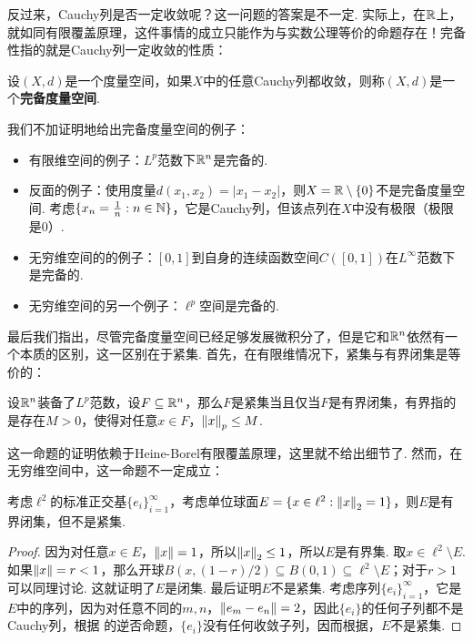 反过来，Cauchy列是否一定收敛呢？这一问题的答案是不一定. 实际上，在$\mathbb{R}$上，就如同有限覆盖原理，这件事情的成立只能作为与实数公理等价的命题存在！完备性指的就是Cauchy列一定收敛的性质：

\begin{definition}[完备度量空间]
    设$(X,d)$是一个度量空间，如果$X$中的任意Cauchy列都收敛，则称$(X,d)$是一个\textbf{完备度量空间}. 
\end{definition}
我们不加证明地给出完备度量空间的例子：
\begin{example}
\begin{itemize}
\item 有限维空间的例子：$L^p$范数下$\mathbb{R}^n$是完备的.
\item 反面的例子：使用度量$d(x_1,x_2)=|x_1-x_2|$，则$X=\mathbb{R}\setminus\{0\}$不是完备度量空间. 考虑$\{x_n=\frac1n:n\in\mathbb{N}\}$，它是Cauchy列，但该点列在$X$中没有极限（极限是$0$）.
\item 无穷维空间的的例子：$[0,1]$到自身的连续函数空间$C([0,1])$在$L^\infty$范数下是完备的.
\item 无穷维空间的另一个例子：$\ell^p$空间是完备的. 
\end{itemize}
\end{example}

最后我们指出，尽管完备度量空间已经足够发展微积分了，但是它和$\mathbb{R}^n$依然有一个本质的区别，这一区别在于紧集. 首先，在有限维情况下，紧集与有界闭集是等价的：

\begin{proposition}\label{prop:compact-bounded}
设$\mathbb{R}^n$装备了$L^p$范数，设$F\subseteq\mathbb{R}^n$，那么$F$是紧集当且仅当$F$是有界闭集，有界指的是存在$M>0$，使得对任意$x\in F$，$\left\|x\right\|_p\leq M$.
\end{proposition}
这一命题的证明依赖于Heine-Borel有限覆盖原理，这里就不给出细节了. 然而，在无穷维空间中，这一命题不一定成立：

\begin{proposition}\label{prop:compact-not-bounded}
考虑$\ell^2$的标准正交基$\{e_i\}_{i=1}^\infty$，考虑单位球面$E=\{x\in\ell^2:\left\|x\right\|_2=1\}$，则$E$是有界闭集，但不是紧集. 
\end{proposition}
\begin{proof}
    因为对任意$x\in E$，$\left\|x\right\|=1$，所以$\left\|x\right\|_2\leq 1$，所以$E$是有界集. 取$x\in\ell^2\setminus E$. 如果$\left\|x\right\|=r<1$，那么开球$B(x,(1-r)/2)\subseteq B(0,1)\subseteq \ell^2\setminus E$；对于$r>1$可以同理讨论. 这就证明了$E$是闭集. 最后证明$E$不是紧集. 考虑序列$\{e_i\}_{i=1}^\infty$，它是$E$中的序列，因为对任意不同的$m,n$，$\left\|e_m-e_n\right\|=2$，因此$\{e_i\}$的任何子列都不是Cauchy列，根据 的逆否命题，$\{e_i\}$没有任何收敛子列，因而根据，$E$不是紧集. 
\end{proof}


